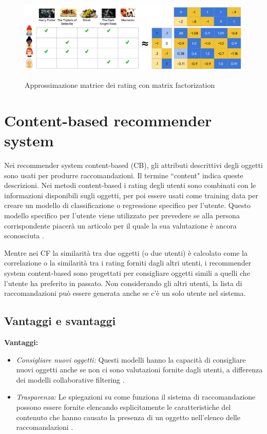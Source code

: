 \begin{figure}
  \centering
  \includegraphics[width=\linewidth]{immagini/matrix_factorization.pdf}
  \caption{Approssimazione matrice dei rating con matrix factorization}
  \cite{mf-google}
  \label{fig:matrix_factorization}
\end{figure}

\section{Content-based recommender system}
Nei recommender system content-based (CB), gli attributi descrittivi degli oggetti sono usati per produrre raccomandazioni. Il termine ``content" indica queste descrizioni. Nei metodi content-based i rating degli utenti sono combinati con le informazioni disponibili sugli oggetti, per poi essere usati come training data per creare un modello di classificazione o regressione specifico per l'utente. Questo modello specifico per l'utente viene utilizzato per prevedere se alla persona corrispondente piacerà un articolo per il quale la sua valutazione è ancora sconosciuta \cite{recsys-book}.

Mentre nei CF la similarità tra due oggetti (o due utenti) è calcolato come la correlazione o la similarità tra i rating forniti dagli altri utenti, i recommender system content-based sono progettati per consigliare oggetti simili a quelli che l'utente ha preferito in passato. Non considerando gli altri utenti, la lista di raccomandazioni può essere generata anche se c'è un solo utente nel sistema.

\subsection{Vantaggi e svantaggi}
\textbf{Vantaggi:}
\begin{itemize}
 \item \textit{Consigliare nuovi oggetti:} Questi modelli hanno la capacità di consigliare nuovi oggetti anche se non ci sono valutazioni fornite dagli utenti, a differenza dei modelli collaborative filtering \cite{recsys-principle-methods-evaluation}.
 
 \item \textit{Trasparenza:} Le spiegazioni su come funziona il sistema di raccomandazione possono essere fornite elencando esplicitamente le caratteristiche del contenuto che hanno causato la presenza di un oggetto nell'elenco delle raccomandazioni \cite{transparency}. 
\end{itemize}


